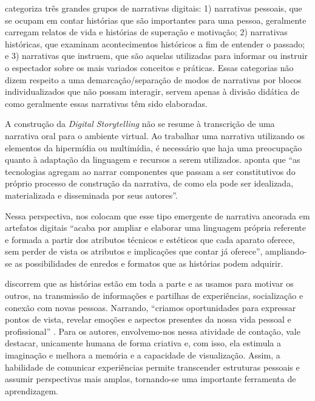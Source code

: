 \documentclass[portuguese]{textolivre}
\begin{document}
\textcite{robin2006usos} categoriza três grandes grupos de narrativas digitais: 1) narrativas pessoais, que se ocupam em contar histórias que são importantes para uma pessoa, geralmente carregam relatos de vida e histórias de superação e motivação; 2) narrativas históricas, que examinam acontecimentos históricos a fim de entender o passado; e 3) narrativas que instruem, que são aquelas utilizadas para informar ou instruir o espectador sobre os mais variados conceitos e práticas. Essas categorias não dizem respeito a uma demarcação/separação de modos de narrativas por blocos individualizados que não possam interagir, servem apenas à divisão didática de como geralmente essas narrativas têm sido elaboradas.

A construção da \textit{Digital Storytelling} não se resume à transcrição de uma narrativa oral para o ambiente virtual. Ao trabalhar uma narrativa utilizando os elementos da hipermídia ou multimídia, é necessário que haja uma preocupação quanto à adaptação da linguagem e recursos a serem utilizados. \textcite[p.~697]{rodrigues2020narrativas} aponta que “as tecnologias agregam ao narrar componentes que passam a ser constitutivos do próprio processo de construção da narrativa, de como ela pode ser idealizada, materializada e disseminada por seus autores”.

Nessa perspectiva, \textcite[p.~328]{moura2023narrativa} nos colocam que esse tipo emergente de narrativa ancorada em artefatos digitais “acaba por ampliar e elaborar uma linguagem própria referente e formada a partir dos atributos técnicos e estéticos que cada aparato oferece, sem perder de vista os atributos e implicações que contar já oferece”, ampliando-se as possibilidades de enredos e formatos que as histórias podem adquirir.

\textcite{hack2013digital} discorrem que as histórias estão em toda a parte e as usamos para motivar os outros, na transmissão de informações e partilhas de experiências, socialização e conexão com novas pessoas. Narrando, “criamos oportunidades para expressar pontos de vista, revelar emoções e aspectos presentes da nossa vida pessoal e profissional” \cite[p.~13]{hack2013digital}. Para os autores, envolvemo-nos nessa atividade de contação, vale destacar, unicamente humana de forma criativa e, com isso, ela estimula a imaginação e melhora a memória e a capacidade de visualização. Assim, a habilidade de comunicar experiências permite transcender estruturas pessoais e assumir perspectivas mais amplas, tornando-se uma importante ferramenta de aprendizagem.
\end{document}
